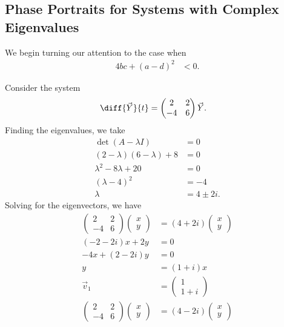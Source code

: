 \documentclass[10pt]{mypackage}
\begin{document}
\subsection{Phase Portraits for Systems with Complex Eigenvalues}%
We begin turning our attention to the case when
\begin{align*}
  4bc + \left(a-d\right)^2 &< 0.
\end{align*}
\begin{example}
  Consider the system
  \begin{align*}
    \diff{\vec{Y}}{t} &= \begin{pmatrix}2 & 2 \\ -4 & 6\end{pmatrix} \vec{Y}.
  \end{align*}
  Finding the eigenvalues, we take
  \begin{align*}
    \det\left(A - \lambda I\right) &= 0\\
    \left(2-\lambda\right)\left(6-\lambda\right) + 8 &= 0\\
    \lambda^2 - 8 \lambda + 20 &= 0\\
    \left(\lambda - 4\right)^2 &= -4\\
    \lambda &= 4 \pm 2i.
  \end{align*}
  Solving for the eigenvectors, we have
  \begin{align*}
    \begin{pmatrix}2 & 2 \\ -4 & 6\end{pmatrix} \begin{pmatrix}x\\y\end{pmatrix} &= \left(4+2i\right) \begin{pmatrix}x\\y\end{pmatrix}\\
    \left(-2-2i\right) x + 2y &= 0\\
    -4x + \left(2-2i\right)y &= 0\\
    y &= \left(1+i\right)x\\
    \vec{v}_1 &= \begin{pmatrix}1\\1+i\end{pmatrix}\\
    \begin{pmatrix}2 & 2 \\ -4 & 6\end{pmatrix} \begin{pmatrix}x\\y\end{pmatrix} &= \left(4-2i\right) \begin{pmatrix}x\\y\end{pmatrix}\\

\end{align*}
\end{example}
\end{document}
